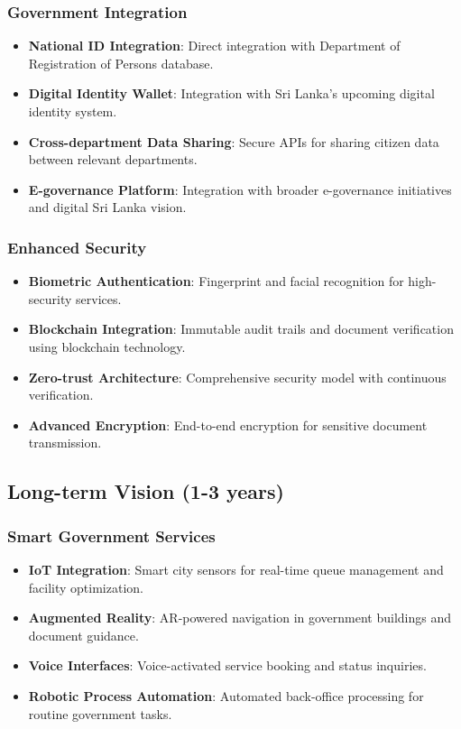 \documentclass[12pt,a4paper]{article}
\begin{document}
\subsubsection{Government Integration}
\begin{itemize}[leftmargin=*]
    \item \textbf{National ID Integration}: Direct integration with Department of Registration of Persons database.
    \item \textbf{Digital Identity Wallet}: Integration with Sri Lanka's upcoming digital identity system.
    \item \textbf{Cross-department Data Sharing}: Secure APIs for sharing citizen data between relevant departments.
    \item \textbf{E-governance Platform}: Integration with broader e-governance initiatives and digital Sri Lanka vision.
\end{itemize}

\subsubsection{Enhanced Security}
\begin{itemize}[leftmargin=*]
    \item \textbf{Biometric Authentication}: Fingerprint and facial recognition for high-security services.
    \item \textbf{Blockchain Integration}: Immutable audit trails and document verification using blockchain technology.
    \item \textbf{Zero-trust Architecture}: Comprehensive security model with continuous verification.
    \item \textbf{Advanced Encryption}: End-to-end encryption for sensitive document transmission.
\end{itemize}

\subsection{Long-term Vision (1-3 years)}

\subsubsection{Smart Government Services}
\begin{itemize}[leftmargin=*]
    \item \textbf{IoT Integration}: Smart city sensors for real-time queue management and facility optimization.
    \item \textbf{Augmented Reality}: AR-powered navigation in government buildings and document guidance.
    \item \textbf{Voice Interfaces}: Voice-activated service booking and status inquiries.
    \item \textbf{Robotic Process Automation}: Automated back-office processing for routine government tasks.
\end{itemize}
\end{document}
